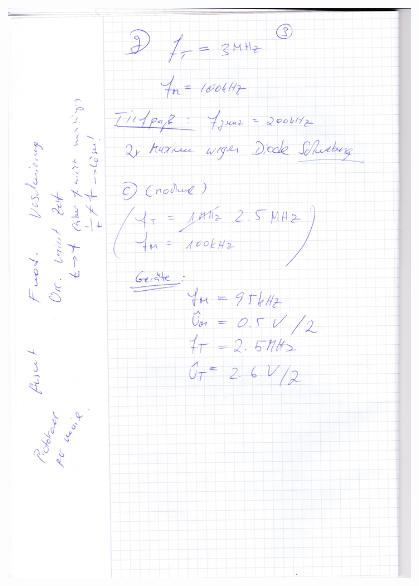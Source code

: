 \FloatBarrier
\begin{figure}
  \centering
  \includegraphics[width=0.95\textwidth]{messheft/seite_3.jpg}
  \caption{}
\label{fig:p3}
\end{figure}

